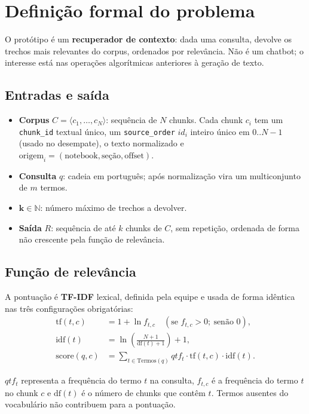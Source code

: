\documentclass[11pt,a4paper]{article}
\begin{document}
\section{Definição formal do problema}\label{sec:def}
O protótipo é um \textbf{recuperador de contexto}: dada uma consulta, devolve os trechos mais
relevantes do corpus, ordenados por relevância. Não é um chatbot; o interesse está nas operações
algorítmicas anteriores à geração de texto.

\subsection{Entradas e saída}
\begin{itemize}[leftmargin=1.4em,itemsep=2pt]
\item \textbf{Corpus} $C = \langle c_1,\dots,c_N\rangle$: sequência de $N$ chunks. Cada chunk $c_i$ tem
um \texttt{chunk\_id} textual único, um \texttt{source\_order} $id_i$ inteiro único em $0..N-1$ (usado
no desempate), o texto normalizado e $\text{origem}_i=(\text{notebook},\text{seção},\text{offset})$.
\item \textbf{Consulta} $q$: cadeia em português; após normalização vira um multiconjunto de $m$ termos.
\item $\mathbf{k}\in\mathbb{N}$: número máximo de trechos a devolver.
\item \textbf{Saída} $R$: sequência de até $k$ chunks de $C$, sem repetição, ordenada de forma não
crescente pela função de relevância.
\end{itemize}
\subsection{Função de relevância}
A pontuação é \textbf{TF-IDF} lexical, definida pela equipe e usada de forma idêntica nas três
configurações obrigatórias:
\begin{align*}
\mathrm{tf}(t,c) &= 1 + \ln f_{t,c}
\quad (\text{se } f_{t,c}>0;\ \text{senão } 0),\\
\mathrm{idf}(t) &= \ln\!\left(\frac{N+1}{\mathrm{df}(t)+1}\right)+1,\\[2pt]
\mathrm{score}(q,c) &=
\sum_{t\in \mathrm{Termos}(q)}
qtf_t \cdot \mathrm{tf}(t,c)\cdot\mathrm{idf}(t).
\end{align*}

$qtf_t$ representa a frequência do termo $t$ na consulta,
$f_{t,c}$ é a frequência do termo $t$ no chunk $c$ e
$\mathrm{df}(t)$ é o número de chunks que contêm $t$.
Termos ausentes do vocabulário não contribuem para a pontuação.
\end{document}
